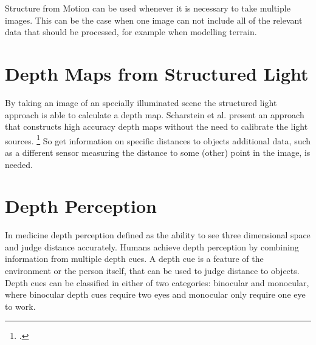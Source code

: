 Structure from Motion can be used whenever it is necessary to take multiple images. This can be the case when one image can not include all of the relevant data that should be processed, for example when modelling terrain.

\section{Depth Maps from Structured Light}
By taking an image of an specially illuminated scene the structured light approach is able to calculate a depth map. Scharstein et al. present an approach that constructs high accuracy depth maps without the need to calibrate the light sources. \footcite{Scharstein_High-accuracy_stereo_depth_maps_using_structured_light} So get information on specific distances to objects additional data, such as a different sensor measuring the distance to some (other) point in the image, is needed.

\section{Depth Perception}
In medicine depth perception defined as the ability to see three dimensional space and judge distance accurately. Humans achieve depth perception by combining information from multiple depth cues. A depth cue is a feature of the environment or the person itself, that can be used to judge distance to objects. Depth cues can be classified in either of two categories: binocular and monocular, where binocular depth cues require two eyes and monocular only require one eye to work.

